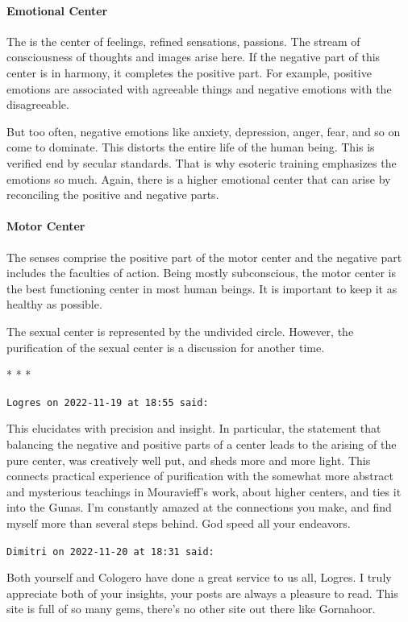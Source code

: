 \paragraph{Emotional Center}

The is the center of feelings, refined sensations, passions. The stream of consciousness of thoughts and images arise here. If the negative part of this center is in harmony, it completes the positive part. For example, positive emotions are associated with agreeable things and negative emotions with the disagreeable.

But too often, negative emotions like anxiety, depression, anger, fear, and so on come to dominate. This distorts the entire life of the human being. This is verified end by secular standards. That is why esoteric training emphasizes the emotions so much. Again, there is a higher emotional center that can arise by reconciling the positive and negative parts.


\paragraph{Motor Center}
The senses comprise the positive part of the motor center and the negative part includes the faculties of action. Being mostly subconscious, the motor center is the best functioning center in most human beings. It is important to keep it as healthy as possible.

The sexual center is represented by the undivided circle. However, the purification of the sexual center is a discussion for another time.


\begin{center}* * *\end{center}

\begin{footnotesize}\begin{sffamily}

\hfill

\texttt{Logres on 2022-11-19 at 18:55 said: }

This elucidates with precision and insight. In particular, the statement that balancing the negative and positive parts of a center leads to the arising of the pure center, was creatively well put, and sheds more and more light. This connects practical experience of purification with the somewhat more abstract and mysterious teachings in Mouravieff's work, about higher centers, and ties it into the Gunas. I'm constantly amazed at the connections you make, and find myself more than several steps behind. God speed all your endeavors.


\hfill

\texttt{Dimitri on 2022-11-20 at 18:31 said: }

Both yourself and Cologero have done a great service to us all, Logres. I truly appreciate both of your insights, your posts are always a pleasure to read. This site is full of so many gems, there's no other site out there like Gornahoor.

\end{sffamily}\end{footnotesize}